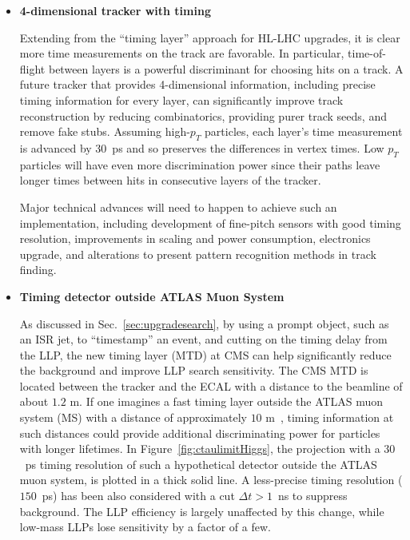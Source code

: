 \begin{itemize}
\item \textbf{4-dimensional tracker with timing} 

Extending from the ``timing layer'' approach for HL-LHC upgrades, it is clear more time measurements on the track are favorable. In particular, time-of-flight between layers is a powerful discriminant for choosing hits on a track. A future tracker that provides 4-dimensional information, including precise timing information for every layer, can significantly improve track reconstruction by reducing combinatorics, providing purer track seeds, and remove fake stubs. Assuming high-$p_T$ particles, each layer's time measurement is advanced by 30~ps and so preserves the differences in vertex times. Low $p_T$ particles will have even more discrimination power since their paths leave longer times between hits in consecutive layers of the tracker.

Major technical advances will need to happen to achieve such an implementation, including development of fine-pitch sensors with good timing resolution, improvements in scaling and power consumption, electronics upgrade, and alterations to present pattern recognition methods in track finding. 

\item \textbf{Timing detector outside ATLAS Muon System}

As discussed in Sec.~\ref{sec:upgradesearch}, by using a prompt object, such as an ISR jet, to ``timestamp'' an event, and cutting on the timing delay from the LLP, the new timing layer (MTD) at CMS can help significantly reduce the background and improve LLP search sensitivity. The CMS MTD is located between the tracker and the ECAL with a distance to the beamline of about $1.2\,\,\mathrm{m}$. If one imagines a fast timing layer outside the ATLAS muon system (MS) with a distance of approximately $10\,\,\mathrm{m}$~\cite{Liu:2018wte}, timing information at such distances could provide additional discriminating power for particles with longer lifetimes. In Figure~\ref{fig:ctaulimitHiggs}, the projection with a $30$~ps timing resolution of such a hypothetical detector outside the ATLAS muon system, is plotted in a thick solid line. A less-precise timing resolution ($150$~ps) has been also considered with a cut $\Delta t > 1$~ns to suppress background. The LLP efficiency is largely unaffected by this change, while low-mass LLPs lose sensitivity by a factor of a few.


\end{itemize}
